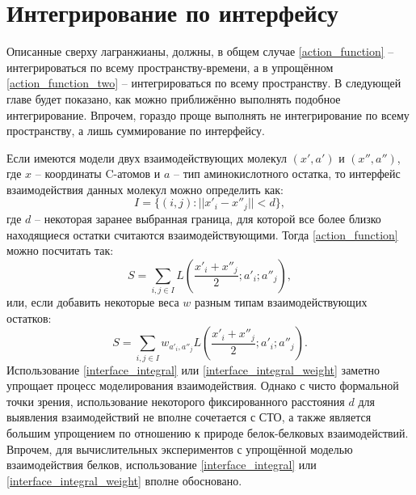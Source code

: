 \section{Интегрирование по интерфейсу}
Описанные сверху лагранжианы, должны, в общем случае \ref{action_function} -- интегрироваться по всему пространству-времени, а в упрощённом \ref{action_function_two} -- интегрироваться по всему пространству.
В следующей главе будет показано, как можно приближённо выполнять подобное интегрирование. Впрочем, гораздо проще выполнять не интегрирование по всему пространству, а лишь суммирование по интерфейсу.

Если имеются модели двух взаимодействующих молекул $(x', a')$ и $(x'', a'')$, где $x$ -- координаты C\textalpha-атомов и $a$ -- тип аминокислотного остатка, то интерфейс взаимодействия данных молекул можно определить как:
\begin{equation}
	I = \{(i, j) : ||x'_i - x''_j|| < d\},
	\label{interface_definition}
\end{equation}
где $d$ -- некоторая заранее выбранная граница, для которой все более близко находящиеся остатки считаются взаимодействующими. Тогда \ref{action_function} можно посчитать так:
\begin{equation}
	S = \sum_{i,j \in I}L(\frac{x'_i + x''_j}{2}; a'_i; a''_j),
	\label{interface_integral}
\end{equation}
или, если добавить некоторые веса $w$ разным типам взаимодействующих остатков:
\begin{equation}
	S = \sum_{i,j \in I}w_{a'_i, a''_j}L(\frac{x'_i + x''_j}{2}; a'_i; a''_j).
	\label{interface_integral_weight}
\end{equation}
Использование \ref{interface_integral} или \ref{interface_integral_weight} заметно упрощает процесс моделирования взаимодействия. Однако с чисто формальной точки зрения, использование некоторого фиксированного расстояния $d$ для выявления взаимодействий не вполне сочетается с СТО, а также является большим упрощением по отношению к природе белок-белковых взаимодействий. Впрочем, для вычислительных экспериментов с упрощённой моделью взаимодействия белков, использование \ref{interface_integral} или \ref{interface_integral_weight} вполне обосновано.